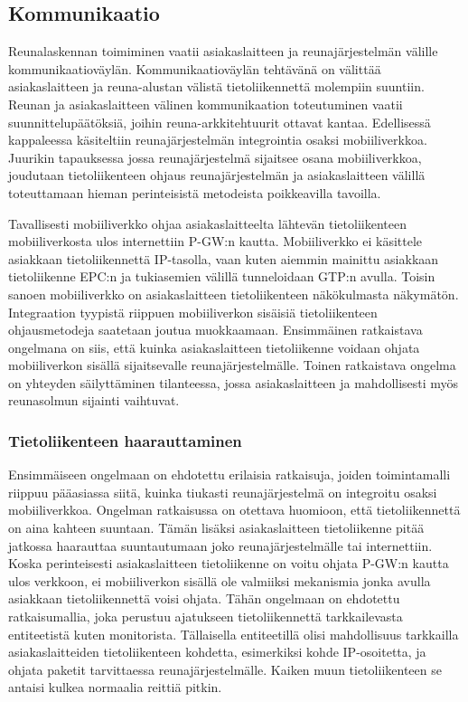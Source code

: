 \subsection{Kommunikaatio} \label{kommunikaatio}
Reunalaskennan toimiminen vaatii asiakaslaitteen ja reunajärjestelmän välille kommunikaatioväylän.
Kommunikaatioväylän tehtävänä on välittää asiakaslaitteen ja reuna-alustan välistä tietoliikennettä molempiin suuntiin.
Reunan ja asiakaslaitteen välinen kommunikaation toteutuminen vaatii suunnittelupäätöksiä, joihin reuna-arkkitehtuurit ottavat kantaa. 
Edellisessä kappaleessa käsiteltiin reunajärjestelmän integrointia osaksi mobiiliverkkoa. Juurikin tapauksessa jossa reunajärjestelmä sijaitsee osana mobiiliverkkoa, joudutaan tietoliikenteen ohjaus reunajärjestelmän ja asiakaslaitteen välillä toteuttamaan hieman perinteisistä metodeista poikkeavilla tavoilla.

Tavallisesti mobiiliverkko ohjaa asiakaslaitteelta lähtevän tietoliikenteen mobiiliverkosta ulos internettiin P-GW:n kautta. 
Mobiiliverkko ei käsittele asiakkaan tietoliikennettä IP-tasolla, vaan kuten aiemmin mainittu asiakkaan tietoliikenne EPC:n ja tukiasemien välillä tunneloidaan GTP:n avulla.
Toisin sanoen mobiiliverkko on asiakaslaitteen tietoliikenteen näkökulmasta näkymätön.
Integraation tyypistä riippuen mobiiliverkon sisäisiä tietoliikenteen ohjausmetodeja saatetaan joutua muokkaamaan.
Ensimmäinen ratkaistava ongelmana on siis, että kuinka asiakaslaitteen tietoliikenne voidaan ohjata mobiiliverkon sisällä sijaitsevalle reunajärjestelmälle.
Toinen ratkaistava ongelma on yhteyden säilyttäminen tilanteessa, jossa asiakaslaitteen ja mahdollisesti myös reunasolmun sijainti vaihtuvat.

\subsubsection*{Tietoliikenteen haarauttaminen}
Ensimmäiseen ongelmaan on ehdotettu erilaisia ratkaisuja, joiden toimintamalli riippuu pääasiassa siitä, kuinka tiukasti reunajärjestelmä on integroitu osaksi mobiiliverkkoa.
Ongelman ratkaisussa on otettava huomioon, että tietoliikennettä on aina kahteen suuntaan. Tämän lisäksi asiakaslaitteen tietoliikenne pitää jatkossa haarauttaa suuntautumaan joko reunajärjestelmälle tai internettiin. 
Koska perinteisesti asiakaslaitteen tietoliikenne on voitu ohjata P-GW:n kautta ulos verkkoon, ei mobiiliverkon sisällä ole valmiiksi mekanismia jonka avulla asiakkaan tietoliikennettä voisi ohjata.
Tähän ongelmaan on ehdotettu ratkaisumallia, joka perustuu ajatukseen tietoliikennettä tarkkailevasta entiteetistä kuten monitorista.
Tällaisella entiteetillä olisi mahdollisuus tarkkailla asiakaslaitteiden tietoliikenteen kohdetta, esimerkiksi kohde IP-osoitetta, ja ohjata paketit tarvittaessa reunajärjestelmälle.
Kaiken muun tietoliikenteen se antaisi kulkea normaalia reittiä pitkin.

